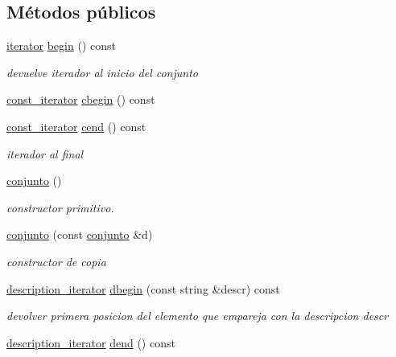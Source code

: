 \subsection*{Métodos públicos}
\begin{DoxyCompactItemize}
\item 
\hypertarget{classconjunto_abc5ad601995f1e28789defd4ba28075c}{}\hyperlink{classconjunto_1_1iterator}{iterator} \hyperlink{classconjunto_abc5ad601995f1e28789defd4ba28075c}{begin} () const \label{classconjunto_abc5ad601995f1e28789defd4ba28075c}

\begin{DoxyCompactList}\small\item\em devuelve iterador al inicio del conjunto \end{DoxyCompactList}\item 
\hyperlink{classconjunto_1_1const__iterator}{const\+\_\+iterator} \hyperlink{classconjunto_a7933f91ed5906a9545f682572cb687f6}{cbegin} () const 
\item 
\hyperlink{classconjunto_1_1const__iterator}{const\+\_\+iterator} \hyperlink{classconjunto_ab29b3d1855e631625dab94db9af9ee9c}{cend} () const 
\begin{DoxyCompactList}\small\item\em iterador al final \end{DoxyCompactList}\item 
\hyperlink{classconjunto_a16d987f42c679efab01748178ba45891}{conjunto} ()
\begin{DoxyCompactList}\small\item\em constructor primitivo. \end{DoxyCompactList}\item 
\hyperlink{classconjunto_ab0944b1f9a0c959ca314ce0debd5def9}{conjunto} (const \hyperlink{classconjunto}{conjunto} \&d)
\begin{DoxyCompactList}\small\item\em constructor de copia \end{DoxyCompactList}\item 
\hyperlink{classconjunto_1_1description__iterator}{description\+\_\+iterator} \hyperlink{classconjunto_ac40bafea5d9dc529c96cf0e5977100c6}{dbegin} (const string \&descr) const 
\begin{DoxyCompactList}\small\item\em devolver primera posicion del elemento que empareja con la descripcion descr \end{DoxyCompactList}\item 
\hyperlink{classconjunto_1_1description__iterator}{description\+\_\+iterator} \hyperlink{classconjunto_aaff3013d49c52c4d3177168338725756}{dend} () const 

\end{DoxyCompactItemize}
